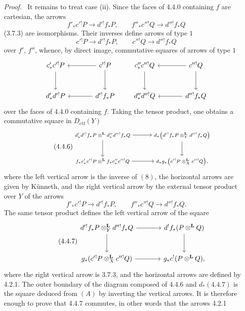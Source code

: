 \documentclass[11pt]{article}
\newenvironment{prooftext}[1][Proof]{\par\noindent\emph{#1.}\ }{\par\medskip}
\providecommand{\Dctf}{D_{\mathrm{ctf}}}
\providecommand{\Dctf}{D_{\mathrm{ctf}}}
\begin{document}
\begin{prooftext}[Proof]
It remains to treat case (ii). Since the faces of 4.4.0 containing $f$ are cartesian, the arrows
\[
f'_*c'{}^!P\longrightarrow d'{}^!f_*P,\qquad
f''_*c''{}^!Q\longrightarrow d''{}^!f_*Q
\]
(3.7.3) are isomorphisms. Their inverses define arrows of type $1$
\[
c'{}^!P\longrightarrow d'{}^!f_*P,\qquad
c''{}^!Q\longrightarrow d''{}^!f_*Q
\]
over $f'$, $f''$, whence, by direct image, commutative squares of arrows of type $1$
\[
\begin{tikzcd}[column sep=large,row sep=large]
c'_*c'{}^!P \arrow[d] & c'{}^!P\arrow[l]\arrow[d]\\
d'_*d'{}^!P & d'{}^!f_*P\arrow[l]
\end{tikzcd}
\qquad
\begin{tikzcd}[column sep=large,row sep=large]
c''_*c''{}^!Q \arrow[d] & c''{}^!Q\arrow[l]\arrow[d]\\
d''_*d''{}^!Q & d''{}^!f_*Q\arrow[l]
\end{tikzcd}
\]
over the faces of 4.4.0 containing $f$. Taking the tensor product, one obtains a commutative square in $\Dctf(Y)$
\begin{equation}
\tag{4.4.6}
{\scriptsize
\begin{tikzcd}[column sep=large,row sep=large]
d'_*d'{}^!f_*P\otimes^{\mathbf L}d''_*d''{}^!f_*Q
 \arrow[r]\arrow[d] &
d_*\bigl(d'{}^!f_*P\otimes_Y^{\mathbf L}d''{}^!f_*Q\bigr)\arrow[d]\\
f_*c'_*c'{}^!P\otimes^{\mathbf L}f_*c''_*c''{}^!Q
 \arrow[r] &
d_*g_*\bigl(c'{}^!P\otimes_X^{\mathbf L}c''{}^!Q\bigr),
\end{tikzcd}
}
\end{equation}
where the left vertical arrow is the inverse of $(8)$, the horizontal arrows are given by Künneth, and the right vertical arrow by the external tensor product over $Y$ of the arrows
\[
f'_*c'{}^!P\longrightarrow d'{}^!f_*P,\qquad
f''_*c''{}^!Q\longrightarrow d''{}^!f_*Q.
\]
The same tensor product defines the left vertical arrow of the square
\begin{equation}
\tag{4.4.7}
\begin{tikzcd}[column sep=large,row sep=large]
d'{}^!f_*P\otimes_Y^{\mathbf L}d''{}^!f_*Q
 \arrow[r]\arrow[d] &
d^!f_*(P\otimes^{\mathbf L}Q)\arrow[d]\\
g_*(c'{}^!P\otimes_X^{\mathbf L}c''{}^!Q)
 \arrow[r] &
g_*c^!(P\otimes^{\mathbf L}Q),
\end{tikzcd}
\end{equation}
where the right vertical arrow is 3.7.3, and the horizontal arrows are defined by 4.2.1. The outer boundary of the diagram composed of 4.4.6 and $d_*(4.4.7)$ is the square deduced from $(A)$ by inverting the vertical arrows. It is therefore enough to prove that 4.4.7 commutes, in other words that the arrows 4.2.1

\end{prooftext}
\end{document}
